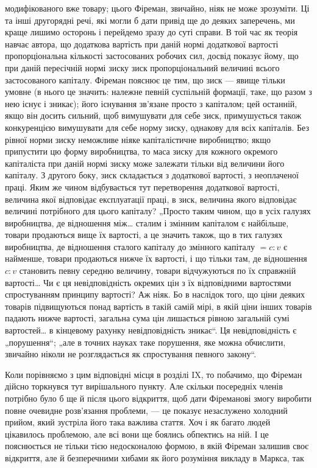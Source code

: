 \parcont{}  %
модифікованого вже товару; цього Фіреман, звичайно, ніяк не
може зрозуміти. Ці та інші другорядні речі, які могли б дати
привід ще до деяких заперечень, ми краще лишимо осторонь
і перейдемо зразу до суті справи. В той час як теорія навчає
автора, що додаткова вартість при даній нормі додаткової вартості
пропорціональна кількості застосованих робочих сил, досвід
показує йому, що при даній пересічній нормі зиску зиск
пропорціональний величині всього застосованого капіталу. Фіреман
пояснює це тим, що зиск — явище тільки умовне (в нього
це значить: належне певній суспільній формації, таке, що разом
з нею існує і зникає); його існування зв’язане просто з капіталом;
цей останній, якщо він досить сильний, щоб вимушувати
для себе зиск, примушується також конкуренцією вимушувати
для себе норму зиску, однакову для всіх капіталів. Без рівної
норми зиску неможливе ніяке капіталістичне виробництво; якщо
припустити цю форму виробництва, то маса зиску для кожного
окремого капіталіста при даній нормі зиску може залежати тільки
від величини його капіталу. З другого боку, зиск складається
з додаткової вартості, з неоплаченої праці. Яким же чином відбувається
тут перетворення додаткової вартості, величина якої
відповідає експлуатації праці, в зиск, величина якого відповідає
величині потрібного для цього капіталу? „Просто таким чином,
що в усіх галузях виробництва, де відношення між\dots{} сталим
і змінним капіталом є найбільше, товари продаються вище їх
вартості, а це значить також, що в тих галузях виробництва,
де відношення сталого капіталу до змінного капіталу $= c : v$ є
найменше, товари продаються нижче їх вартості, і що тільки
там, де відношення $c : v$ становить певну середню величину,
товари відчужуються по їх справжній вартості\dots{} Чи є ця невідповідність
окремих цін з їх відповідними вартостями спростуванням
принципу вартості? Аж ніяк. Бо в наслідок того, що
ціни деяких товарів підвищуються понад вартість в такій самій
мірі, в якій ціни інших товарів падають нижче вартості, загальна
сума цін лишається рівною загальній сумі вартостей\dots{}
в кінцевому рахунку невідповідність зникає“. Ця невідповідність
є „порушення“; „але в точних науках таке порушення, яке можна
обчислити, звичайно ніколи не розглядається як спростування
певного закону“.

Коли порівняємо з цим відповідні місця в розділі IX, то побачимо,
що Фіреман дійсно торкнувся тут вирішального пункту.
Але скільки посередніх членів потрібно було б ще й після цього
відкриття, щоб дати Фіреманові змогу виробити повне очевидне
розв’язання проблеми, — це показує незаслужено холодний
прийом, який зустріла його така важлива стаття. Хоч і як багато
людей цікавилось проблемою, але всі вони ще боялись обпектись
на ній. І це пояснюється не тільки тією недосконалою
формою, в якій Фіреман залишив своє відкриття, але й безперечними
хибами як його розуміння викладу в Маркса, так
\parbreak{}  %
